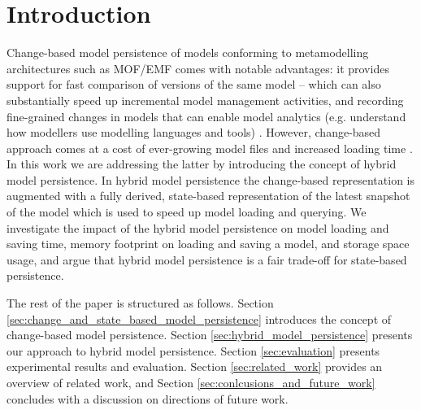 \documentclass[10pt,conference]{IEEEtran}
\begin{document}
\section{Introduction}
\label{sec:introduction}
Change-based model persistence of models conforming to metamodelling architectures such as MOF/EMF \cite{DBLP:conf/models/YohannisKP17} comes with notable advantages: it provides support for fast comparison of versions of the same model \cite{DBLP:conf/sde/LippeO92,DBLP:conf/caise/IgnatN05,DBLP:conf/edoc/KoegelHLHD10,koegel2010emfstore}  -- which can also substantially speed up incremental model management activities, and recording fine-grained changes in models that can enable model analytics (e.g. understand how modellers use modelling languages and tools) \cite{DBLP:journals/entcs/RobbesL07}. However, change-based approach comes at a cost of ever-growing model files \cite{DBLP:conf/edoc/KoegelHLHD10,DBLP:journals/entcs/RobbesL07} and increased loading time \cite{mens2002state}. In this work we are addressing the latter by introducing the concept of hybrid model persistence. In hybrid model persistence the change-based representation is augmented with a fully derived, state-based representation of the latest snapshot of the model which is used to speed up model loading and querying. We investigate the impact of the hybrid model persistence on model loading and saving time, memory footprint on loading and saving a model, and storage space usage, and argue that hybrid model persistence is a fair trade-off for state-based persistence.
 
The rest of the paper is structured as follows. Section \ref{sec:change_and_state_based_model_persistence} introduces the concept of change-based model persistence. Section \ref{sec:hybrid_model_persistence} presents our approach to hybrid model persistence. Section \ref{sec:evaluation} presents experimental results and evaluation. Section \ref{sec:related_work} provides an overview of related work, and Section \ref{sec:conlcusions_and_future_work} concludes with a discussion on directions of future work.
\end{document}
